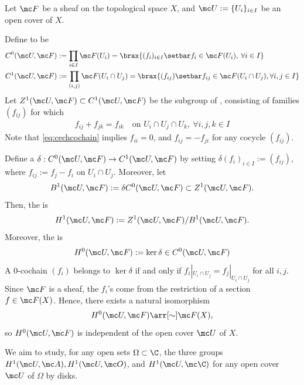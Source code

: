 \documentclass[11pt]{report}
\begin{document}
Let $\mc F$ be a sheaf on the topological space $X$, and $\mc U:= \{U_i\}_{i \in I}$ be an open cover of $X$.
\begin{defn}
    Define  to be 
    \begin{align*}
        C^0(\mc U,\mc F) &:= \prod_{i \in I}\mc F(U_i) = \brax{ (f_i)_{i \in I} \setbar f_i \in \mc F(U_i), \: \forall i \in I} \\
        C^1 (\mc U,\mc F) &:= \prod_{(i,j)}\mc F(U_i \cap U_j)=\brax{ (f_{ij}) \setbar f_{ij} \in \mc F (U_i \cap U_j), \forall i,j \in I}
    \end{align*}
    Let $Z^1(\mc U,\mc F) \subset C^1(\mc U, \mc F)$ be the subgroup of , consisting of families $(f_{ij})$ for which
    \begin{align} \label{eq:cechcochain}
        f_{ij}+f_{jk}=f_{ik} \quad \text{on } U_i \cap U_j \cap U_k, \: \forall i,j,k \in I
    \end{align}
    Note that \eqref{eq:cechcochain} implies $f_{ii}=0$, and $f_{ij}=-f_{ji}$ for any cocycle $(f_{ij})$.

    Define a  $\delta: C^0(\mc U,\mc F)\to C^1(\mc U,\mc F)$ by setting $\delta(f_i)_{i\in I}:=(f_{ij})$, where $f_{ij}:= f_j-f_i$ on $U_i \cap U_j$. Moreover, let
    \[ B^1(\mc U,\mc F) := \delta C^0(\mc U,\mc F) \subset Z^1(\mc U,\mc F). \]
    Then, the  is
    \[
    H^1(\mc U,\mc F):= Z^1(\mc U,\mc F)/B^1 (\mc U, \mc F).
    \]
    Moreover, the  is
    \[
    H^0(\mc U,\mc F):= \ker \delta \in C^0(\mc U,\mc F)
    \]
    A $0$-cochain $(f_i)$ belongs to $\ker \delta$ if and only if $f_{i}|_{U_i \cap U_j}=f_j|_{U _i \cap U_j}$ for all $i, j$. Since $\mc F$ is a sheaf, the $f_i$'s come from the restriction of a section $f \in \mc F(X)$. Hence, there exists a natural isomorphism
    \[
    H^0(\mc U,\mc F) \arr[\sim]\mc F(X),
    \]
    so $H^0(\mc U,\mc F)$ is independent of the open cover $\mc U$ of $X$.
\end{defn}

\begin{notethm*}[Goal]
    We aim to study, for any open sets $\Omega \subset \C$, the three groups $H^1(\mc U, \mc A), H^1(\mc U, \mc O)$, and $H^1(\mc U, \mc \C)$ for any open cover $\mc U$ of $\Omega$ by disks.
\end{notethm*}
\end{document}
